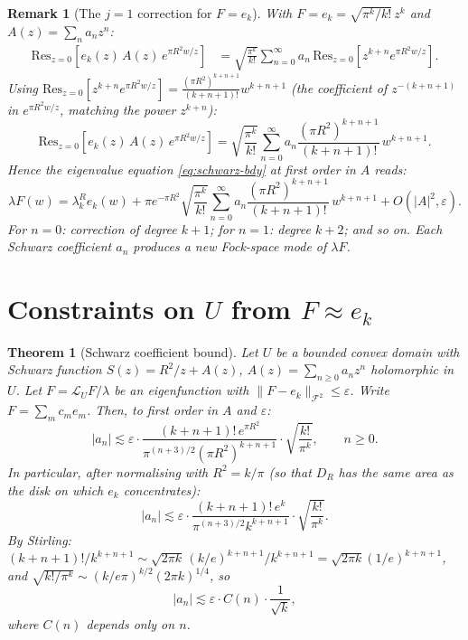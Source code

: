 \documentclass[a4paper,11pt,reqno]{amsart}
\newtheorem{theorem}{Theorem}[section]
\newtheorem{remark}{Remark}[section]
\begin{document}
\begin{remark}[The $j=1$ correction for $F=e_k$]
\label{rem:j1}
With $F=e_k=\sqrt{\pi^k/k!}\,z^k$ and $A(z)=\sum_n a_n z^n$:
\begin{align*}
\mathrm{Res}_{z=0}\!\left[e_k(z)\,A(z)\,e^{\pi R^2 w/z}\right]
&=\sqrt{\frac{\pi^k}{k!}}\sum_{n=0}^\infty a_n\,\mathrm{Res}_{z=0}\!\left[z^{k+n}e^{\pi R^2 w/z}\right].
\end{align*}
Using $\mathrm{Res}_{z=0}[z^{k+n}e^{\pi R^2 w/z}]=\frac{(\pi R^2)^{k+n+1}}{(k+n+1)!}w^{k+n+1}$
(the coefficient of $z^{-(k+n+1)}$ in $e^{\pi R^2 w/z}$, matching the power $z^{k+n}$):
\[
\mathrm{Res}_{z=0}\!\left[e_k(z)\,A(z)\,e^{\pi R^2 w/z}\right]
=\sqrt{\frac{\pi^k}{k!}}\sum_{n=0}^\infty a_n\frac{(\pi R^2)^{k+n+1}}{(k+n+1)!}\,w^{k+n+1}.
\]
Hence the eigenvalue equation \eqref{eq:schwarz-bdy} at first order in $A$ reads:
\begin{equation}\label{eq:ev-perturbed}
\lambda F(w)
=\lambda_k^R e_k(w)
+\pi e^{-\pi R^2}\sqrt{\frac{\pi^k}{k!}}
\sum_{n=0}^\infty a_n\frac{(\pi R^2)^{k+n+1}}{(k+n+1)!}\,w^{k+n+1}
+O(|A|^2,\varepsilon).
\end{equation}
For $n=0$: correction of degree $k+1$; for $n=1$: degree $k+2$; and so on.
Each Schwarz coefficient $a_n$ produces a new Fock-space mode of $\lambda F$.
\end{remark}

\section{Constraints on $U$ from $F\approx e_k$}
\label{sec:constraints}

\begin{theorem}[Schwarz coefficient bound]
\label{thm:schwarz-bound}
Let $U$ be a bounded convex domain with Schwarz function $S(z)=R^2/z+A(z)$,
$A(z)=\sum_{n\ge0}a_nz^n$ holomorphic in $U$. Let $F=\mathcal{L}_UF/\lambda$
be an eigenfunction with $\|F-e_k\|_{\mathcal{F}^2}\le\varepsilon$. Write
$F=\sum_m c_m e_m$. Then, to first order in $A$ and $\varepsilon$:
\[
|a_n|
\lesssim
\varepsilon
\cdot
\frac{(k+n+1)!\,e^{\pi R^2}}{\pi^{(n+3)/2}(\pi R^2)^{k+n+1}}
\cdot\sqrt{\frac{k!}{\pi^k}},
\qquad n\ge0.
\]
In particular, after normalising with $R^2=k/\pi$ (so that $D_R$ has the same
area as the disk on which $e_k$ concentrates):
\begin{equation}\label{eq:an-bound}
|a_n|\lesssim\varepsilon\cdot\frac{(k+n+1)!\,e^k}{\pi^{(n+3)/2}k^{k+n+1}}
\cdot\sqrt{\frac{k!}{\pi^k}}.
\end{equation}
By Stirling: $(k+n+1)!/k^{k+n+1}\sim\sqrt{2\pi k}\,(k/e)^{k+n+1}/k^{k+n+1}
=\sqrt{2\pi k}(1/e)^{k+n+1}$, and $\sqrt{k!/\pi^k}\sim(k/e\pi)^{k/2}(2\pi k)^{1/4}$,
so
\[
|a_n|\lesssim\varepsilon\cdot C(n)\cdot\frac{1}{\sqrt{k}},
\]
where $C(n)$ depends only on $n$.
\end{theorem}
\end{document}
